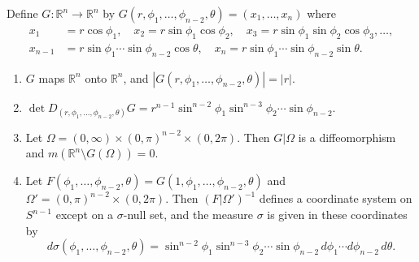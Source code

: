 	\begin{exercise}[Folland 2.65]
		Define $G : \mathbb{R}^n \to \mathbb{R}^n$ by $G(r, \phi_1, \dots, \phi_{n-2}, \theta) = (x_1, \dots, x_n)$ where
		\begin{align}
			x_1 &= r \cos \phi_1, \quad x_2 = r \sin \phi_1 \cos \phi_2, \quad x_3 = r \sin \phi_1 \sin \phi_2 \cos \phi_3, \dots, \\
			x_{n-1} &= r \sin \phi_1 \cdots \sin \phi_{n-2} \cos \theta, \quad x_n = r \sin \phi_1 \cdots \sin \phi_{n-2} \sin \theta.
		\end{align}
		\begin{enumerate}[label=\textbf{\alph*.}]
			\item $G$ maps $\mathbb{R}^n$ onto $\mathbb{R}^n$, and $|G(r, \phi_1, \dots, \phi_{n-2}, \theta)| = |r|$.
			\item $\det D_{(r, \phi_1, \dots, \phi_{n-2}, \theta)} G = r^{n-1} \sin^{n-2} \phi_1 \sin^{n-3} \phi_2 \cdots \sin \phi_{n-2}$.
			\item Let $\Omega = (0, \infty) \times (0, \pi)^{n-2} \times (0, 2\pi)$. Then $G|\Omega$ is a diffeomorphism and $m(\mathbb{R}^n \setminus G(\Omega)) = 0$.
			\item Let $F(\phi_1, \dots, \phi_{n-2}, \theta) = G(1, \phi_1, \dots, \phi_{n-2}, \theta)$ and $\Omega' = (0, \pi)^{n-2} \times (0, 2\pi)$. Then $(F|\Omega')^{-1}$ defines a coordinate system on $S^{n-1}$ except on a $\sigma$-null set, and the measure $\sigma$ is given in these coordinates by
			\begin{equation}
				d\sigma(\phi_1, \dots, \phi_{n-2}, \theta) = \sin^{n-2} \phi_1 \sin^{n-3} \phi_2 \cdots \sin \phi_{n-2} \, d\phi_1 \cdots d\phi_{n-2} \, d\theta.
			\end{equation}
		\end{enumerate}
	\end{exercise}
	\begin{solution}

	\end{solution}

